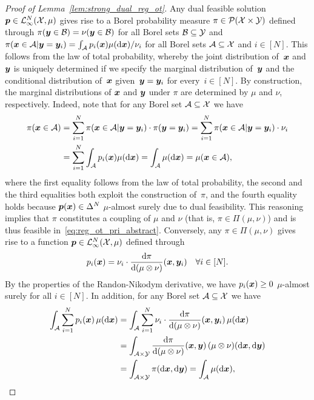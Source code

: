 \documentclass[11pt, a4paper, oneside, reqno]{article}
\begin{document}
\begin{proof}[Proof of Lemma~\ref{lem:strong_dual_reg_ot}]
		Any dual feasible solution $\boldsymbol p\in \mathcal L^N_\infty(\mathcal{X},\mu)$ gives rise to a Borel probability measure $\pi \in \mathcal P(\mathcal X \times \mathcal Y)$ defined through $\pi( \boldsymbol y \in \mathcal B) = \nu(\boldsymbol y \in \mathcal B)$ for all Borel sets $\mathcal B \subseteq \mathcal Y$ and $\pi(\boldsymbol x \in \mathcal A | \boldsymbol y = \boldsymbol y_i) = \int_{ \mathcal A} p_i(\boldsymbol x) \mu(\mathrm{d} \boldsymbol x) / \nu_i$ for all Borel sets $\mathcal A \subseteq \mathcal X$ and $i \in [N]$. This follows from the law of total probability, whereby the joint distribution of~$\boldsymbol x$ and~$\boldsymbol y$ is uniquely determined if we specify the marginal distribution of~$\boldsymbol y$ and the conditional distribution of~$\boldsymbol x$ given~$\boldsymbol y=\boldsymbol y_i$ for every~$i\in[N]$. By construction, the marginal distributions of $\boldsymbol x$ and $\boldsymbol y$ under $\pi$ are determined by $\mu$ and $\nu$, respectively. Indeed, note that for any Borel set $\mathcal A \subseteq \mathcal X$ we have 
		\begin{align*}
		\pi(\boldsymbol x \in \mathcal A) &= \sum\limits_{i=1}^N \pi(\boldsymbol x \in \mathcal A | \boldsymbol y = \boldsymbol y_i) \cdot \pi(\boldsymbol y = \boldsymbol y_i) = \sum\limits_{i=1}^N \pi(\boldsymbol x \in \mathcal A | \boldsymbol y = \boldsymbol y_i) \cdot \nu_i\\ &= \sum\limits_{i=1}^N \int_{\mathcal A} {p_i(\boldsymbol x)}\mu(\mathrm{d} \boldsymbol x) = \int_{\mathcal A} \mu(\mathrm{d} \boldsymbol x) = \mu(\boldsymbol x\in \mathcal A),
		\end{align*}
		where the first equality follows from the law of total probability, the second and the third equalities both exploit the construction of~$\pi$, and the fourth equality holds because $\boldsymbol p(\boldsymbol x)\in\Delta^N$ $\mu$-almost surely due to dual feasibility. This reasoning implies that $\pi$ constitutes a coupling of $\mu$ and $\nu$ (that is, $\pi \in \Pi(\mu, \nu)$) and is thus feasible in~\eqref{eq:reg_ot_pri_abstract}. Conversely, any $\pi\in\Pi(\mu,\nu)$ gives rise to a function $\boldsymbol p\in\mathcal L_\infty^N(\mathcal{X},\mu)$ defined through  
		\[
		p_i(\boldsymbol x) =\nu_i\cdot \frac{\mathrm{d} \pi}{\mathrm{d} (\mu \otimes \nu)} (\boldsymbol x, \boldsymbol y_i)\quad \forall i\in [N].
		\]
		By the properties of the Randon-Nikodym derivative, we have $p_i(\boldsymbol x)\ge 0$ $\mu$-almost surely for all $i\in[N]$. In addition, for any Borel set $\mathcal A\subseteq \mathcal{X}$ we have
		\begin{align*}
		\int_{\mathcal A}\sum_{i=1}^N p_i(\bs x)\,\mu(\diff\bs x) & = \int_{\mathcal A} \sum_{i=1}^N \nu_i\cdot \frac{\diff \pi}{\diff (\mu \otimes \nu)} (\bs x, \bs y_i)\,\mu(\diff\bs x)\\ & = \int_{\mathcal A\times \y} \frac{\diff \pi}{\diff (\mu\otimes \nu)} (\bs x, \bs y)\,(\mu\otimes \nu)(\diff \bs x,\diff\bs y) \\&= \int_{\mathcal A\times \y} \pi(\diff\bs x, \diff \bs y) = \int_{\mathcal A}\mu(\diff\bs x),

\end{align*}
\end{proof}
\end{document}
